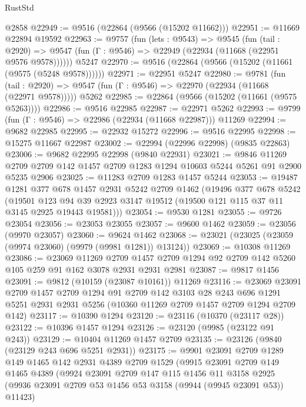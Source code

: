 \begin{lexlean}{RustStd}
\begin{coremodule}
    @2858
@22949 := @9516 (@22864 (@9566 (@15202 @11662)))
@22951 := @11669 @22894 @19592
@22963 := @9757
    (fun (lets : @9543) =>
    @9545
      (fun (tail : @2920) =>
      @9547 (fun (Γ : @9546) => @22949 (@22934 (@11668 (@22951 @9576 @9578))))))
    @5247
@22970 := @9516 (@22864 (@9566 (@15202 (@11661 (@9575 (@5248 @9578))))))
@22971 := @22951 @5247
@22980 := @9781
    (fun (tail : @2920) => @9547 (fun (Γ : @9546) => @22970 (@22934 (@11668 (@22971 @9578)))))
    @5262
@22985 := @22864 (@9566 (@15202 (@11661 (@9575 @5263))))
@22986 := @9516 @22985
@22987 := @22971 @5262
@22993 := @9799 (fun (Γ : @9546) => @22986 (@22934 (@11668 @22987))) @11269
@22994 := @9682 @22985
@22995 := @22932 @15272
@22996 := @9516 @22995
@22998 := @15275 @11667 @22987
@23002 := @22994 (@22996 @22998) (@9835 @22863)
@23006 := @9682 @22995 @22998 (@9840 @22931)
@23021 := @9846
    @11269
    @2709
    @2709
    @142
    @1457
    @2709
    @1283
    @1294
    @10603
    @5244
    @5261
    @91
    @2900
    @5235
    @2906
@23025 := @11283 @2709 @1283 @1457 @5244
@23053 := @19487
    @1281
    @377
    @678
    @1457
    @2931
    @5242
    @2709
    @1462
    (@19496
      @377
      @678
      @5242
      (@19501 @123 @94 @39 @2923 @3147 @19512 (@19500 @121 @115 @37 @11 @3145 @2925 @19443 @19581)))
@23054 := @9530 @1281
@23055 := @9726 @23054
@23056 := @23053 @23055
@23057 := @9600 @1462
@23059 := @23056 (@9970 @23057)
@23060 := @9624 @1462
@23068 := @23021 (@23025 (@23059 (@9974 @23060) (@9979 (@9981 @1281)) @13124))
@23069 := @10308 @11269
@23086 := @23069
    @11269
    @2709
    @1457
    @2709
    @1294
    @92
    @2709
    @142
    @5260
    @105
    @259
    @91
    @162
    @3078
    @2931
    @2931
    @2981
@23087 := @9817 @1456
@23091 := @9812 (@10159 (@23087 @10161)) @11269
@23116 := @23069
    @23091
    @2709
    @1457
    @2709
    @1294
    @91
    @2709
    @142
    @3103
    @28
    @243
    @696
    @1291
    @5251
    @2931
    @2931
    @5256
    (@10360 @11269 @2709 @1457 @2709 @1294 @2709 @142)
@23117 := @10390 @1294
@23120 := @23116 (@10370 (@23117 @28))
@23122 := @10396 @1457 @1294
@23126 := @23120 (@9985 (@23122 @91 @243))
@23129 := @10404 @11269 @1457 @2709
@23135 := @23126 (@9840 (@23129 @243 @696 @5251 @2931))
@23175 := @9901
    @23091
    @2709
    @1289
    @149
    @1465
    @142
    @2931
    @4389
    @2709
    @1529
    (@9915
      @23091
      @2709
      @149
      @1465
      @4389
      (@9924
        @23091
        @2709
        @147
        @115
        @1456
        @11
        @3158
        @2925
        (@9936 @23091 @2709 @53 @1456 @53 @3158 (@9944 (@9945 @23091 @53)) @11423)

\end{coremodule}
\end{lexlean}
